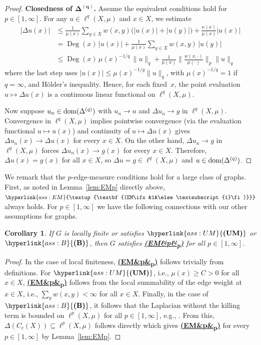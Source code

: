 \documentclass[letterpaper]{article}
\newtheorem{corollary}[lemma]{Corollary}
\theoremstyle{definition}
\theoremstyle{named}
\numberwithin{equation}{section}
\newcommand{\UM}{\hyperlink{ass:UM}{\textup{\textbf{(UM)}}}}
\newcommand{\B}{\hyperlink{ass:B}{\textup{\textbf{(B)}}}}
\newcommand{\EM}[1][]{\hyperlink{ass:EM}{\textup{\textbf{(EM\ifx&#1&\else\textsubscript{#1}\fi)}}}}
\newcommand{\dom}{\textnormal{dom}} %
\newcommand{\Deg}{\operatorname{Deg}}
\begin{document}
\begin{proof}
\textbf{Closedness of $\boldsymbol{\Delta^{(q)}}$.}
Assume the equivalent conditions hold for $p \in [1,\infty]$. For any $u\in\ell^{q}(X,\mu)$
and $x\in X$, we estimate
\begin{align*}
  |\Delta u(x)|
  &\le \frac{1}{\mu(x)}\sum_{y\in X}w(x,y)\bigl(|u(x)|+|u(y)|\bigr)
       +\frac{\kappa(x)}{\mu(x)}|u(x)|\\
  &= \Deg(x)\,|u(x)|
     +\frac{1}{\mu(x)}\sum_{y\in X}w(x,y)\,|u(y)|\\
  &\le \Deg(x)\,\mu(x)^{-1/q}\,\|u\|_{q}
     +\frac{1}{\mu(x)}
       \biggl\|\frac{w(x,\cdot)}{\mu(\cdot)}\biggr\|_{p}
       \|u\|_{q}
\end{align*}
where the last step uses $|u(x)|\le\mu(x)^{-1/q}\|u\|_{q}$, with  $\mu(x)^{-1/q}=1$ if $q=\infty$, and
H\"older's inequality.
Hence, for each fixed~$x$, the point evaluation
$u\mapsto\Delta u(x)$ is a continuous linear functional on
$\ell^{q}(X,\mu)$.

Now suppose $u_n\in\dom(\Delta^{(q)})$ with $u_n\to u$ and
$\Delta u_n\to g$ in $\ell^{q}(X,\mu)$.
Convergence in $\ell^{q}(X,\mu)$ implies pointwise convergence (via
the evaluation functional $u\mapsto u(x)$) and continuity of
$u\mapsto\Delta u(x)$ gives $\Delta u_n(x)\to\Delta u(x)$ for every $x \in X$.
On the other hand, $\Delta u_n\to g$ in $\ell^{q}(X,\mu)$ forces
$\Delta u_n(x)\to g(x)$ for every $x \in X$.
Therefore, $\Delta u(x)=g(x)$ for all $x\in X$, so
$\Delta u=g\in\ell^{q}(X,\mu)$ and $u\in\dom(\Delta^{(q)})$.
\end{proof}

We remark that the $p$-edge-measure conditions hold for a large class
of graphs. First, as noted in Lemma~\ref{lem:EMp} directly above, 
$\EM[1]$ always holds.
For $p \in [1,\infty]$ we have the following connections with our other assumptions
for graphs.
\begin{corollary}\label{c:emp}
    If $G$ is locally finite or
    satisfies $\UM$ or $\B$, then $G$ satisfies \EM[p] for all $p \in [1,\infty]$.
\end{corollary}
\begin{proof}
    In the case of local finiteness, \EM[p] follows trivially from definitions.
    For $\UM$, i.e., $\mu(x) \geq C >0$ for all $x \in X$, 
    \EM[p] follows
    from the local summability of the edge weight 
    at $x \in X$, i.e., $\sum_y w(x,y)<\infty$ for all $x \in X$.
    Finally, in the case of $\B$, it follows that the Laplacian without
    the killing term is bounded on $\ell^p(X,\mu)$ for all $p \in [1,\infty]$, e.g., 
    \cite[Theorem~2.15]{keller2021graphs}. From this, $\Delta(C_c(X)) \subseteq \ell^p(X,\mu)$
    follows directly which gives \EM[p] for every $p \in [1,\infty]$ by Lemma~\ref{lem:EMp}.
\end{proof}
\end{document}

